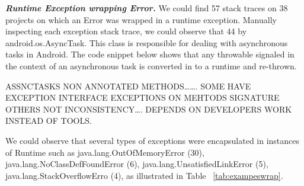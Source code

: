 \documentclass[conference]{IEEEtran}
\begin{document}
\emph{\textbf{Runtime Exception wrapping Error.}} We could find  57 stack traces 
on 38 projects on which an Error was wrapped in a runtime exception.
Manually inspecting each exception stack trace, we could observe that 44%
by android.os.AsyncTask. This class is responsible for dealing with asynchronous tasks in Android.
The code snippet below shows that any throwable signaled in the context of an asynchronous 
task is converted in to a runtime and re-thrown.

ASSNCTASKS NON ANNOTATED METHODS…….
SOME HAVE EXCEPTION INTERFACE 
EXCEPTIONS ON MEHTODS SIGNATURE OTHERS NOT
INCONSISTENCY…. DEPENDS ON DEVELOPERS 
WORK INSTEAD OF TOOLS.



We could observe that several types of exceptions were encapsulated in 
instances of Runtime such as java.lang.OutOfMemoryError (30), java.lang.NoClassDefFoundError (6), 
java.lang.UnsatisfiedLinkError (5), java.lang.StackOverflowErro (4), as illustrated in Table ~\ref{tab:exampeswrap}.
\end{document}
